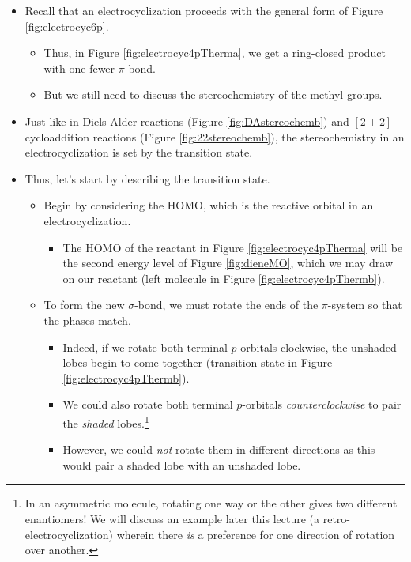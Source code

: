 \documentclass[../notes.tex]{subfiles}
\begin{document}
\begin{itemize}
\begin{figure}[H]
    \end{figure}
    \begin{itemize}
        \item Recall that an electrocyclization proceeds with the general form of Figure \ref{fig:electrocyc6p}.
        \begin{itemize}
            \item Thus, in Figure \ref{fig:electrocyc4pTherma}, we get a ring-closed product with one fewer $\pi$-bond.
            \item But we still need to discuss the stereochemistry of the methyl groups.
        \end{itemize}
        \item Just like in Diels-Alder reactions (Figure \ref{fig:DAstereochemb}) and $[2+2]$ cycloaddition reactions (Figure \ref{fig:22stereochemb}), the stereochemistry in an electrocyclization is set by the transition state.
        \item Thus, let's start by describing the transition state.
        \begin{itemize}
            \item Begin by considering the HOMO, which is the reactive orbital in an electrocyclization.
            \begin{itemize}
                \item The HOMO of the reactant in Figure \ref{fig:electrocyc4pTherma} will be the second energy level of Figure \ref{fig:dieneMO}, which we may draw on our reactant (left molecule in Figure \ref{fig:electrocyc4pThermb}).
            \end{itemize}
            \item To form the new $\sigma$-bond, we must rotate the ends of the $\pi$-system so that the phases match.
            \begin{itemize}
                \item Indeed, if we rotate both terminal $p$-orbitals clockwise, the unshaded lobes begin to come together (transition state in Figure \ref{fig:electrocyc4pThermb}).
                \item We could also rotate both terminal $p$-orbitals \emph{counterclockwise} to pair the \emph{shaded} lobes.\footnote{In an asymmetric molecule, rotating one way or the other gives two different enantiomers! We will discuss an example later this lecture (a retro-electrocyclization) wherein there \emph{is} a preference for one direction of rotation over another.}
                \item However, we could \emph{not} rotate them in different directions as this would pair a shaded lobe with an unshaded lobe.

\end{itemize}
\end{itemize}
\end{itemize}
\end{itemize}
\end{document}
